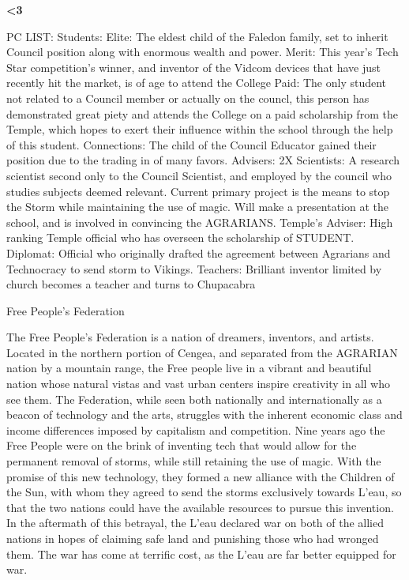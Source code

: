 \documentclass[blue]{GL2020}
\begin{document}
\name{\bTest{}}



\bf{<3}

PC LIST:
	Students:
		Elite: The eldest child of the Faledon family, set to inherit Council position along with enormous 
					wealth and power.
		Merit: This year's Tech Star competition's winner, and inventor of the Vidcom devices that have just
					recently hit the market, is of age to attend the College
		Paid: The only student not related to a Council member or actually on the councl, this person has
					demonstrated great piety and attends the College on a paid scholarship from the Temple, which 
					hopes to exert their influence within the school through the help of this student.
		Connections: The child of the Council Educator gained their position due to the trading in of many favors.
	Advisers:
		2X Scientists:  A research scientist second only to the Council Scientist, and employed by the council who
			studies subjects deemed relevant.  Current primary project is the means to stop the Storm while 
			maintaining the use of magic.  Will make a presentation at the school, and is involved in convincing the
			AGRARIANS.
		Temple's Adviser:  High ranking Temple official who has overseen the scholarship of STUDENT.
		Diplomat: Official who originally drafted the agreement between Agrarians and Technocracy to send storm
			to Vikings.	
	Teachers:
		Brilliant inventor limited by church becomes a teacher and turns to Chupacabra
			

Free People's Federation %

The Free People's Federation is a nation of dreamers, inventors, and artists.  Located in the northern portion of Cengea, and separated from the AGRARIAN nation by a mountain range, the Free people live in a vibrant and beautiful nation whose natural vistas and vast urban centers inspire creativity in all who see them.  The Federation, while seen both nationally and internationally as a beacon of technology and the arts, struggles with the inherent economic class and income differences imposed by capitalism and competition.  Nine years ago the Free People were on the brink of inventing tech that would allow for the permanent removal of storms, while still retaining the use of magic.  With the promise of this new technology, they formed a new alliance with the Children of the Sun, with whom they agreed to send the storms exclusively towards L'eau, so that the two nations could have the available resources to pursue this invention.  In the aftermath of this betrayal, the L'eau declared war on both of the allied nations in hopes of claiming safe land and punishing those who had wronged them.  The war has come at terrific cost, as the L'eau are far better equipped for war.
\end{document}
